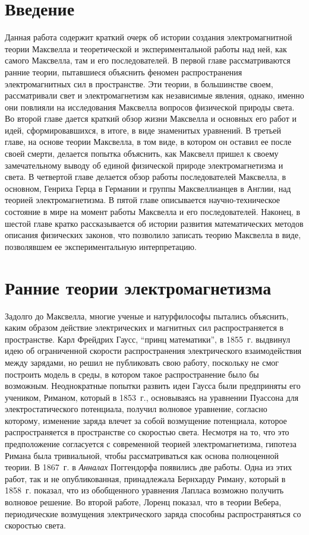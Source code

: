\documentclass[12pt, oneside, a4paper]{article}
\begin{document}
\tableofcontents
\newpage
\section{Введение}
Данная работа содержит краткий очерк об истории создания электромагнитной теории Максвелла и теоретической и экспериментальной работы над ней, как самого Максвелла, там и его последователей. В первой главе рассматриваются ранние теории, пытавшиеся объяснить феномен распространения электромагнитных сил в пространстве. Эти теории, в большинстве своем, рассматривали свет и электромагнетизм как независимые явления, однако, именно они повлияли на исследования Максвелла вопросов физической природы света. Во второй главе дается краткий обзор жизни Максвелла и основных его работ и идей, сформировавшихся, в итоге, в виде знаменитых уравнений. В третьей главе, на основе теории Максвелла, в том виде, в котором он оставил ее после своей смерти, делается попытка объяснить, как Максвелл пришел к своему замечательному выводу об единой физической природе электромагнетизма и света. В четвертой главе делается обзор работы последователей Максвелла, в основном, Генриха Герца в Германии и группы Максвеллианцев в Англии, над теорией электромагнетизма. В пятой главе описывается научно-техническое состояние в мире на момент работы Максвелла и его последователей. Наконец, в шестой главе кратко  рассказывается об истории развития математических методов описания физических законов, что позволило записать теорию Максвелла в виде, позволявшем ее экспериментальную интерпретацию.
\section{Ранние теории электромагнетизма}
Задолго до Максвелла, многие ученые и натурфилософы пытались объяснить, каким образом действие электрических и магнитных  сил распространяется в пространстве. Карл Фрейдрих Гаусс, ``принц математики'', в 1855~г. выдвинул идею об ограниченной скорости распространения электрического взаимодействия между зарядами, но решил не публиковать свою работу, поскольку не смог построить модель в среды, в котором такое распространение было бы возможным. Неоднократные попытки развить идеи Гаусса были предприняты его учеником, Риманом, который в 1853~г., основываясь на уравнении Пуассона для электростатического потенциала, получил волновое уравнение, согласно которому, изменение заряда влечет за собой возмущение потенциала, которое распространяется в пространстве со скоростью света. Несмотря на то, что это предположение согласуется с современной теорией электромагнетизма, гипотеза Римана была тривиальной, чтобы рассматриваться как основа полноценной теории. В 1867~г. в \emph{Анналах} Поггендорфа появились две работы. Одна из этих работ, так и не опубликованная, принадлежала Бернхарду Риману, который в 1858~г. показал, что из обобщенного уравнения Лапласа возможно получить волновое решение. Во второй работе, Лоренц показал, что в теории Вебера, периодические возмущения электрического заряда способны распространяться со скоростью света.
\end{document}
